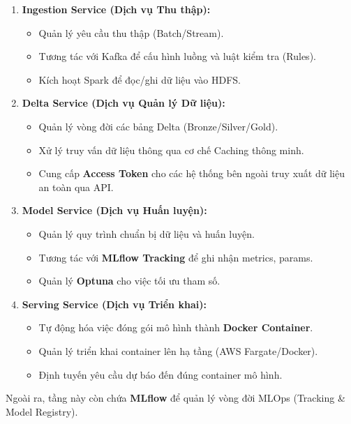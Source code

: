 \begin{enumerate}
    \item \textbf{Ingestion Service (Dịch vụ Thu thập):}
    \begin{itemize}
        \item Quản lý yêu cầu thu thập (Batch/Stream).
        \item Tương tác với Kafka để cấu hình luồng và luật kiểm tra (Rules).
        \item Kích hoạt Spark để đọc/ghi dữ liệu vào HDFS.
    \end{itemize}
    
    \item \textbf{Delta Service (Dịch vụ Quản lý Dữ liệu):}
    \begin{itemize}
        \item Quản lý vòng đời các bảng Delta (Bronze/Silver/Gold).
        \item Xử lý truy vấn dữ liệu thông qua cơ chế Caching thông minh.
        \item Cung cấp \textbf{Access Token} cho các hệ thống bên ngoài truy xuất dữ liệu an toàn qua API.
    \end{itemize}
    
    \item \textbf{Model Service (Dịch vụ Huấn luyện):}
    \begin{itemize}
        \item Quản lý quy trình chuẩn bị dữ liệu và huấn luyện.
        \item Tương tác với \textbf{MLflow Tracking} để ghi nhận metrics, params.
        \item Quản lý \textbf{Optuna} cho việc tối ưu tham số.
    \end{itemize}
    
    \item \textbf{Serving Service (Dịch vụ Triển khai):}
    \begin{itemize}
        \item Tự động hóa việc đóng gói mô hình thành \textbf{Docker Container}.
        \item Quản lý triển khai container lên hạ tầng (AWS Fargate/Docker).
        \item Định tuyến yêu cầu dự báo đến đúng container mô hình.
    \end{itemize}
\end{enumerate}

Ngoài ra, tầng này còn chứa \textbf{MLflow} để quản lý vòng đời MLOps (Tracking \& Model Registry).

